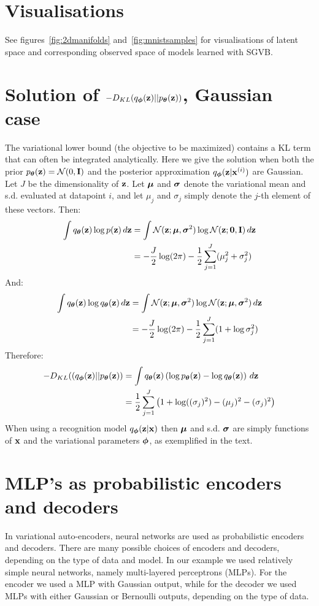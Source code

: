 
\section{Visualisations}
\label{ap:visualisations}
See figures~\ref{fig:2dmanifolds} and~\ref{fig:mnistsamples} for visualisations of latent space and corresponding observed space of models learned with SGVB.

\section{Solution of $- D_{KL}(q_{\boldsymbol{\phi}}(\mathbf{z}) || p_{\boldsymbol{\theta}}(\mathbf{z}))$, Gaussian case}
\label{ap:kl_solution}
The variational lower bound (the objective to be maximized) contains a KL term that can often be integrated analytically. Here we give the solution when both the prior $p_{\boldsymbol{\theta}}(\mathbf{z}) = \mathcal{N}(0,\mathbf{I})$ and the posterior approximation $q_{\boldsymbol{\phi}}(\mathbf{z}|\mathbf{x}^{(i)})$ are Gaussian. Let $J$ be the dimensionality of $\mathbf{z}$. Let $\boldsymbol{\mu}$ and $\boldsymbol{\sigma}$ denote the variational mean and s.d. evaluated at datapoint $i$, and let $\mu_j$ and $\sigma_j$ simply denote the $j$-th element of these vectors. Then:
\begin{align*}
\int q_{\boldsymbol{\theta}}(\mathbf{z}) \log p(\mathbf{z}) \,d\mathbf{z}
&= \int \mathcal{N}(\mathbf{z};\boldsymbol{\mu},\boldsymbol{\sigma}^2) \log \mathcal{N}(\mathbf{z};\mathbf{0},\mathbf{I}) \,d\mathbf{z} \\
&=  - \frac{J}{2} \log (2 \pi) - \frac{1}{2} \sum_{j=1}^J (\mu_j^2 + \sigma_j^2)
\end{align*}
And:
\begin{align*}
\int q_{\boldsymbol{\theta}}(\mathbf{z}) \log q_{\boldsymbol{\theta}}(\mathbf{z}) \,d\mathbf{z}
&= \int \mathcal{N}(\mathbf{z};\boldsymbol{\mu},\boldsymbol{\sigma}^2) \log \mathcal{N}(\mathbf{z};\boldsymbol{\mu},\boldsymbol{\sigma}^2) \,d\mathbf{z} \\
&= - \frac{J}{2} \log (2 \pi) - \frac{1}{2} \sum_{j=1}^J ( 1 + \log \sigma^2_j )
\end{align*}
Therefore:
\begin{align*}
- D_{KL}((q_{\boldsymbol{\phi}}(\mathbf{z}) || p_{\boldsymbol{\theta}}(\mathbf{z})) &= \int q_{\boldsymbol{\theta}}(\mathbf{z}) \left(\log p_{\boldsymbol{\theta}}(\mathbf{z}) - \log q_{\boldsymbol{\theta}}(\mathbf{z})\right) \,d\mathbf{z} \\
&= \frac{1}{2} \sum_{j=1}^J \left(1 + \log ((\sigma_j)^2) - (\mu_j)^2 - (\sigma_j)^2 \right)
\end{align*}
When using a recognition model $q_{\boldsymbol{\phi}}(\mathbf{z}|\mathbf{x})$ then $\boldsymbol{\mu}$ and s.d. $\boldsymbol{\sigma}$ are simply functions of $\mathbf{x}$ and the variational parameters $\boldsymbol{\phi}$, as exemplified in the text.

\section{MLP's as probabilistic encoders and decoders}
\label{ap:encoders_decoders}
In variational auto-encoders, neural networks are used as probabilistic encoders and decoders. There are many possible choices of encoders and decoders, depending on the type of data and model. In our example we used relatively simple neural networks, namely multi-layered perceptrons (MLPs). For the encoder we used a MLP with Gaussian output, while for the decoder we used MLPs with either Gaussian or Bernoulli outputs, depending on the type of data.

